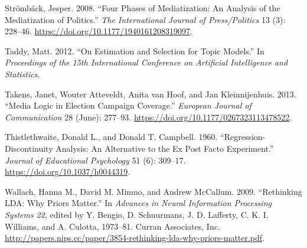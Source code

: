 \documentclass[
]{article}
\begin{document}
\leavevmode\hypertarget{ref-stromback_four_2008}{}%
Strömbäck, Jesper. 2008. ``Four Phases of Mediatization: An Analysis of
the Mediatization of Politics.'' \emph{The International Journal of
Press/Politics} 13 (3): 228--46.
\url{https://doi.org/10.1177/1940161208319097}.

\leavevmode\hypertarget{ref-taddy_estimation_2012}{}%
Taddy, Matt. 2012. ``On Estimation and Selection for Topic Models.'' In
\emph{Proceedings of the 15th International Conference on Artificial
Intelligence and Statistics}.

\leavevmode\hypertarget{ref-takens_media_2013}{}%
Takens, Janet, Wouter Atteveldt, Anita van Hoof, and Jan Kleinnijenhuis.
2013. ``Media Logic in Election Campaign Coverage.'' \emph{European
Journal of Communication} 28 (June): 277--93.
\url{https://doi.org/10.1177/0267323113478522}.

\leavevmode\hypertarget{ref-thistlethwaite_regression-discontinuity_1960}{}%
Thistlethwaite, Donald L., and Donald T. Campbell. 1960.
``Regression-Discontinuity Analysis: An Alternative to the Ex Post Facto
Experiment.'' \emph{Journal of Educational Psychology} 51 (6): 309--17.
\url{https://doi.org/10.1037/h0044319}.

\leavevmode\hypertarget{ref-wallach_rethinking_2009}{}%
Wallach, Hanna M., David M. Mimno, and Andrew McCallum. 2009.
``Rethinking LDA: Why Priors Matter.'' In \emph{Advances in Neural
Information Processing Systems 22}, edited by Y. Bengio, D. Schuurmans,
J. D. Lafferty, C. K. I. Williams, and A. Culotta, 1973--81. Curran
Associates, Inc.
\url{http://papers.nips.cc/paper/3854-rethinking-lda-why-priors-matter.pdf}.
\end{document}
